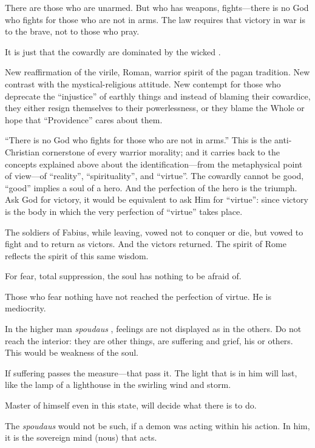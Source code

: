 \begin{quotex}
There are those who are unarmed. But who has weapons, fights---there is no God who fights for those who are not in arms. The law requires that victory in war is to the brave, not to those who pray.

It is just that the cowardly are dominated by the wicked .
\end{quotex}


New reaffirmation of the virile, Roman, warrior spirit of the pagan tradition. New contrast with the mystical-religious attitude. New contempt for those who deprecate the ``injustice'' of earthly things and instead of blaming their cowardice, they either resign themselves to their powerlessness, or they blame the Whole or hope that ``Providence'' cares about them.

``There is no God who fights for those who are not in arms.'' This is the anti-Christian cornerstone of every warrior morality; and it carries back to the concepts explained above about the identification---from the metaphysical point of view---of ``reality'', ``spirituality'', and ``virtue''. The cowardly cannot be good, ``good'' implies a soul of a hero. And the perfection of the hero is the triumph. Ask God for victory, it would be equivalent to ask Him for ``virtue'': since victory is the body in which the very perfection of ``virtue'' takes place.

The soldiers of Fabius, while leaving, vowed not to conquer or die, but vowed to fight and to return as victors. And the victors returned. The spirit of Rome reflects the spirit of this same wisdom.

\begin{quotex}
For fear, total suppression, the soul has nothing to be afraid of.

Those who fear nothing have not reached the perfection of virtue. He is mediocrity.

In the higher man \emph{spoudaus} , feelings are not displayed as in the others. Do not reach the interior: they are other things, are suffering and grief, his or others. This would be weakness of the soul.

If suffering passes the measure---that pass it. The light that is in him will last, like the lamp of a lighthouse in the swirling wind and storm.

Master of himself even in this state, will decide what there is to do.

The \emph{spoudaus} would not be such, if a demon was acting within his action. In him, it is the sovereign mind (nous) that acts.
\end{quotex}


